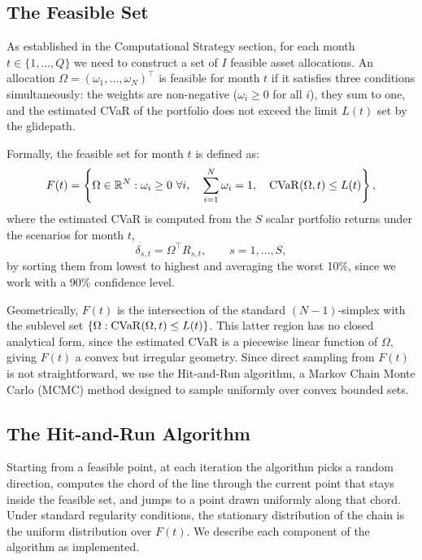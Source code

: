 \subsection{The Feasible Set}

As established in the Computational Strategy section, for each month $t \in \{1,\ldots,Q\}$ we need to construct a set of $I$ feasible asset allocations. An allocation $\Omega=(\omega_1,\ldots,\omega_N)^{\top}$ is feasible for month $t$ if it satisfies three conditions simultaneously: the weights are non-negative ($\omega_i \geq 0$ for all $i$), they sum to one, and the estimated CVaR of the portfolio does not exceed the limit $L(t)$ set by the glidepath.

Formally, the feasible set for month $t$ is defined as:
\begin{equation}
F(t)=\left\{
\Omega \in \mathbb{R}^{N}:
\omega_i \geq 0\ \forall i,\quad
\sum_{i=1}^{N}\omega_i=1,\quad
\mathrm{CVaR}(\Omega,t)\leq L(t)
\right\},
\end{equation}
where the estimated CVaR is computed from the $S$ scalar portfolio returns under the scenarios for month $t$,
\begin{equation}
\delta_{s,t} = \Omega^{\top}R_{s,t}, \qquad s=1,\ldots,S,
\end{equation}
by sorting them from lowest to highest and averaging the worst 10\%, since we work with a 90\% confidence level.

Geometrically, $F(t)$ is the intersection of the standard $(N-1)$-simplex with the sublevel set $\{\Omega:\mathrm{CVaR}(\Omega,t)\leq L(t)\}$. This latter region has no closed analytical form, since the estimated CVaR is a piecewise linear function of $\Omega$, giving $F(t)$ a convex but irregular geometry. Since direct sampling from $F(t)$ is not straightforward, we use the Hit-and-Run algorithm, a Markov Chain Monte Carlo (MCMC) method designed to sample uniformly over convex bounded sets.

\subsection{The Hit-and-Run Algorithm}

Starting from a feasible point, at each iteration the algorithm picks a random direction, computes the chord of the line through the current point that stays inside the feasible set, and jumps to a point drawn uniformly along that chord. Under standard regularity conditions, the stationary distribution of the chain is the uniform distribution over $F(t)$. We describe each component of the algorithm as implemented.

